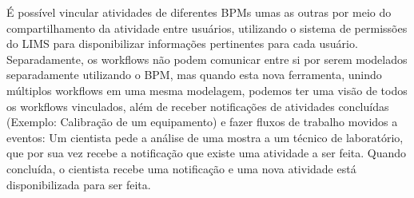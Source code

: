 É possível vincular atividades de diferentes BPMs umas as outras por meio do compartilhamento da atividade entre usuários, utilizando o sistema de permissões do LIMS para disponibilizar informações pertinentes para cada usuário. Separadamente, os workflows não podem comunicar entre si por serem modelados separadamente utilizando o BPM, mas quando esta nova ferramenta, unindo múltiplos workflows em uma mesma modelagem, podemos ter uma visão de todos os workflows vinculados, além de receber notificações de atividades concluídas (Exemplo: Calibração de um equipamento) e fazer fluxos de trabalho movidos a eventos: Um cientista pede a análise de uma mostra a um técnico de laboratório, que por sua vez recebe a notificação que existe uma atividade a ser feita. Quando concluída, o cientista recebe uma notificação e uma nova atividade está disponibilizada para ser feita.